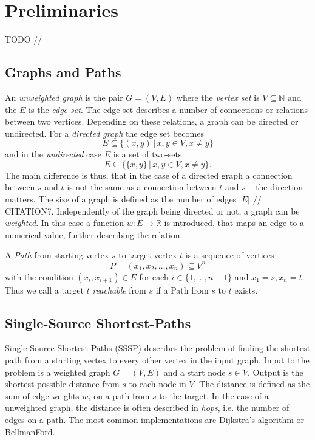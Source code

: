 
\section{Preliminaries}
TODO //

\subsection{Graphs and Paths}
An \emph{unweighted graph} is the pair $G=(V,E)$ where the \emph{vertex set} is $V\subseteq\mathbb N$ and the $E$ is the \emph{edge set}.
The edge set describes a number of connections or relations between two vertices. Depending on these relations, a graph can be directed or undirected. For a \emph{directed graph} the edge set becomes 
\begin{equation*}
  E\subseteq\{(x,y)\,|\, x,y\in V, x\neq y\}
\end{equation*}
and in the \emph{undirected} case $E$ is a set of two-sets 
\begin{equation*}
  E\subseteq\{\{x,y\}\,|\, x,y\in V, x\neq y\}.
\end{equation*}
The main difference is thus, that in the case of a directed graph a connection between $s$ and $t$ is not the same as a connection between $t$ and $s$ -- the direction matters.
The size of a graph is defined as the number of edges $|E|$ // CITATION?.
Independently of the graph being directed or not, a graph can be \emph{weighted}. In this case a function $w:E\rightarrow \mathbb R$ is introduced, that maps an edge to a numerical value, further describing the relation.

A \emph{Path} from starting vertex $s$ to target vertex $t$ is a sequence of vertices
\begin{equation*}
	P=(x_1,x_2,\ldots,x_n)\subseteq V^n
\end{equation*}
with the condition $(x_i,x_{i+1})\in E$ for each $i\in\{1,\ldots,n-1\}$ and $x_1=s, x_n=t$.
Thus we call a target $t$ \emph{reachable} from $s$ if a Path from $s$ to $t$ exists.

\subsection{Single-Source Shortest-Paths}
Single-Source Shortest-Paths (SSSP) describes the problem of finding the shortest path from a starting vertex to every other vertex in the input graph.
Input to the problem is a weighted graph $G=(V,E)$ and a start node $s\in V$. Output is the shortest possible distance from $s$ to each node in $V$. 
The distance is defined as the sum of edge weights $w_i$ on a path from $s$ to the target.
In the case of a unweighted graph, the distance is often described in \emph{hops}, i.e. the number of edges on a path.
The most common implementations are Dijkstra's algorithm or BellmanFord.


